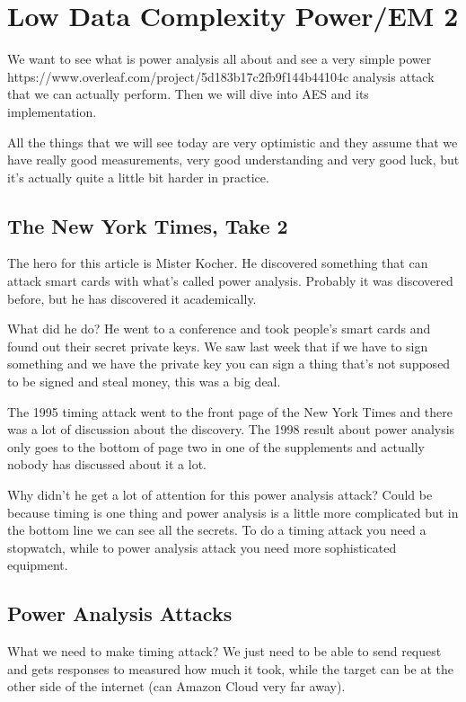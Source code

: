 \chapter{Low Data Complexity Power/EM 2}

We want to see what is power analysis all about and see a very simple power https://www.overleaf.com/project/5d183b17c2fb9f144b44104c analysis attack that we can actually perform. Then we will dive into AES and its implementation.

All the things that we will see today are very optimistic and they assume that we have really good measurements, very good understanding and very good luck, but it's actually quite a little bit harder in practice.

\section{The New York Times, Take 2}
The hero for this article is Mister Kocher. He discovered something that can attack smart cards with what's called power analysis. Probably it was discovered before, but he has discovered it academically.

What did he do? He went to a conference and took people's smart cards and found out their secret private keys. We saw last week that if we have to sign something and we have the private key you can sign a thing that's not supposed to be signed and steal money, this was a big deal.

The 1995 timing attack went to the front page of the New York Times and there was a lot of discussion about the discovery. The 1998 result about power analysis only goes to the bottom of page two in one of the supplements and actually nobody has discussed about it a lot. 

Why didn't he get a lot of attention for this power analysis attack?
Could be because timing is one thing and power analysis is a little more complicated but in the bottom line we can see all the secrets.
To do a timing attack you need a stopwatch, while to power analysis attack you need more sophisticated equipment.

\section{Power Analysis Attacks}
What we need to make timing attack? We just need to be able to send request and gets responses to measured how much it took, while the target can be at the other side of the internet (can Amazon Cloud very far away).

